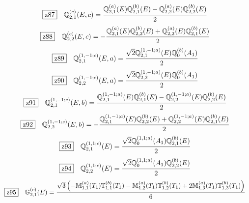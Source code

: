 \documentclass[fleqn,10pt,landscape]{jsarticle}
\begin{document}
\begin{dmath*}
\hspace*{3mm}\fbox{z87}\quad \mathbb{Q}_{2,1}^{(c)}(E,c)=\frac{\mathbb{Q}_{2,1}^{(a)}(E) \mathbb{Q}_{2,1}^{(b)}(E) - \mathbb{Q}_{2,2}^{(a)}(E) \mathbb{Q}_{2,2}^{(b)}(E)}{2}
\end{dmath*}
\begin{dmath*}
\hspace*{3mm}\fbox{z88}\quad \mathbb{Q}_{2,2}^{(c)}(E,c)=- \frac{\mathbb{Q}_{2,1}^{(a)}(E) \mathbb{Q}_{2,2}^{(b)}(E) + \mathbb{Q}_{2,2}^{(a)}(E) \mathbb{Q}_{2,1}^{(b)}(E)}{2}
\end{dmath*}
\begin{dmath*}
\hspace*{3mm}\fbox{z89}\quad \mathbb{Q}_{2,1}^{(1,-1;c)}(E,a)=\frac{\sqrt{2} \mathbb{Q}_{2,1}^{(1,-1;a)}(E) \mathbb{Q}_{0}^{(b)}(A_{1})}{2}
\end{dmath*}
\begin{dmath*}
\hspace*{3mm}\fbox{z90}\quad \mathbb{Q}_{2,2}^{(1,-1;c)}(E,a)=\frac{\sqrt{2} \mathbb{Q}_{2,2}^{(1,-1;a)}(E) \mathbb{Q}_{0}^{(b)}(A_{1})}{2}
\end{dmath*}
\begin{dmath*}
\hspace*{3mm}\fbox{z91}\quad \mathbb{Q}_{2,1}^{(1,-1;c)}(E,b)=\frac{\mathbb{Q}_{2,1}^{(1,-1;a)}(E) \mathbb{Q}_{2,1}^{(b)}(E) - \mathbb{Q}_{2,2}^{(1,-1;a)}(E) \mathbb{Q}_{2,2}^{(b)}(E)}{2}
\end{dmath*}
\begin{dmath*}
\hspace*{3mm}\fbox{z92}\quad \mathbb{Q}_{2,2}^{(1,-1;c)}(E,b)=- \frac{\mathbb{Q}_{2,1}^{(1,-1;a)}(E) \mathbb{Q}_{2,2}^{(b)}(E) + \mathbb{Q}_{2,2}^{(1,-1;a)}(E) \mathbb{Q}_{2,1}^{(b)}(E)}{2}
\end{dmath*}
\begin{dmath*}
\hspace*{3mm}\fbox{z93}\quad \mathbb{Q}_{2,1}^{(1,1;c)}(E)=\frac{\sqrt{2} \mathbb{Q}_{0}^{(1,1;a)}(A_{1}) \mathbb{Q}_{2,1}^{(b)}(E)}{2}
\end{dmath*}
\begin{dmath*}
\hspace*{3mm}\fbox{z94}\quad \mathbb{Q}_{2,2}^{(1,1;c)}(E)=\frac{\sqrt{2} \mathbb{Q}_{0}^{(1,1;a)}(A_{1}) \mathbb{Q}_{2,2}^{(b)}(E)}{2}
\end{dmath*}
\begin{dmath*}
\hspace*{3mm}\fbox{z95}\quad \mathbb{G}_{2,1}^{(c)}(E)=\frac{\sqrt{3} \left(- \mathbb{M}_{1,1}^{(a)}(T_{1}) \mathbb{T}_{1,1}^{(b)}(T_{1}) - \mathbb{M}_{1,2}^{(a)}(T_{1}) \mathbb{T}_{1,2}^{(b)}(T_{1}) + 2 \mathbb{M}_{1,3}^{(a)}(T_{1}) \mathbb{T}_{1,3}^{(b)}(T_{1})\right)}{6}
\end{dmath*}
\end{document}
